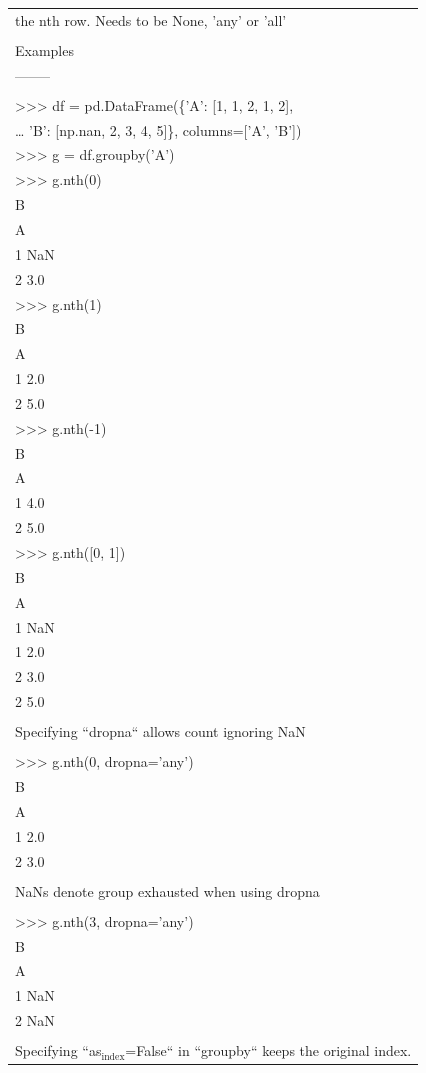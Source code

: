 \documentclass[11pt]{article}
\begin{document}
\begin{enumerate}
\begin{enumerate}
\begin{enumerate}
\begin{center}
\begin{tabular}{l}
the nth row. Needs to be None, 'any' or 'all'\\
\\
Examples\\
--------\\
\\
>>> df = pd.DataFrame(\{'A': [1, 1, 2, 1, 2],\\
\ldots{}                    'B': [np.nan, 2, 3, 4, 5]\}, columns=['A', 'B'])\\
>>> g = df.groupby('A')\\
>>> g.nth(0)\\
B\\
A\\
1  NaN\\
2  3.0\\
>>> g.nth(1)\\
B\\
A\\
1  2.0\\
2  5.0\\
>>> g.nth(-1)\\
B\\
A\\
1  4.0\\
2  5.0\\
>>> g.nth([0, 1])\\
B\\
A\\
1  NaN\\
1  2.0\\
2  3.0\\
2  5.0\\
\\
Specifying ``dropna`` allows count ignoring NaN\\
\\
>>> g.nth(0, dropna='any')\\
B\\
A\\
1  2.0\\
2  3.0\\
\\
NaNs denote group exhausted when using dropna\\
\\
>>> g.nth(3, dropna='any')\\
B\\
A\\
1 NaN\\
2 NaN\\
\\
Specifying ``as\(_{\text{index}}\)=False`` in ``groupby`` keeps the original index.\\

\end{tabular}
\end{center}
\end{enumerate}
\end{enumerate}
\end{enumerate}
\end{document}
